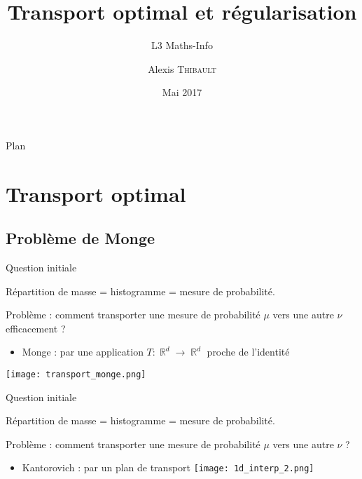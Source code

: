 \documentclass{beamer}
\title{Transport optimal et régularisation}
\subtitle{L3 Maths-Info}
\author{Alexis \textsc{Thibault}}
\institute{ENS}
\date{Mai 2017}
\DeclareMathOperator{\IR}{\mathbb{R}}
\begin{document}
\begin{frame}
  \titlepage
\end{frame}

\begin{frame}{Plan}
  \tableofcontents
\end{frame}





\section{Transport optimal}

\subsection{Problème de Monge}

\begin{frame}{Question initiale}

	Répartition de masse = histogramme = mesure de probabilité.
	
    Problème : comment transporter une mesure de probabilité $\mu$ vers une autre $\nu$ efficacement ?
	\pause
    \begin{itemize}
    \item Monge : par une application 
    $ T :     \IR^d     \rightarrow     \IR^d $ \og proche \fg de l'identité
    \end{itemize}
    \begin{center}\texttt{[image: transport\_monge.png]}\end{center}
    
\end{frame}

\begin{frame}{Question initiale}

	Répartition de masse = histogramme = mesure de probabilité.
	
    Problème : comment transporter une mesure de probabilité $\mu$ vers une autre $\nu$ ?
    \begin{itemize}
    \item Kantorovich : par un plan de transport
    \texttt{[image: 1d\_interp\_2.png]}
    \end{itemize}
    
\end{frame}
\end{document}
